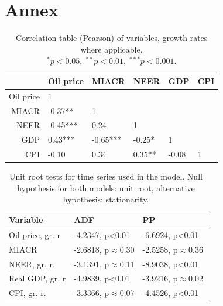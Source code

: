 \documentclass[12pt, a4paper]{extarticle}
\begin{document}
\printbibliography
{}
\newpage
\setcounter{figure}{0}
\setcounter{table}{0}
\makeatletter
\renewcommand*{\thetable}{\alph{table}}
\renewcommand*{\thefigure}{\alph{figure}}
\let\c@table\c@figure
\makeatother 

\section*{Annex}
\label{app}

\begin{table}[h!]
\centering
	\begin{tabular}{@{}rlllll@{}}
	  \toprule
	 & Oil price & MIACR & NEER & GDP & CPI \\ 
	  \midrule
	 	Oil price & 1 &  &  &  &\\ 
  		MIACR& -0.37**  & 1 &  &  & \\ 
  		NEER & -0.45*** & 0.24  &  1  & & \\ 
  		GDP &  0.43***  &  -0.65*** & -0.25* & 1 & \\ 
  		CPI & -0.10  & 0.34  &  0.35** &  -0.08 & 1 \\ 
	   \bottomrule
	\end{tabular}
	\caption{Correlation table (Pearson) of variables, growth rates where applicable.\\ $^*p<0.05,\; ^{**}p<0.01,\;^{***}p<0.001$.}
	\label{table:correlation_variables}
\end{table}

\begin{table}[h!]
	\centering
		\begin{tabular}{@{}lll@{}}
			 \toprule
			Variable & ADF & PP \\
			\midrule
			Oil price, gr. r     & {-4.2347, p\textless{}0.01} &{-6.6924, p\textless{}0.01}   \\
			MIACR                & {-2.6818, p$\approx$0.30}          & {-2.5258, p$\approx$0.36}          \\
			NEER, gr. r.         & {-3.1391, p$\approx$0.11} & {-8.9038, p\textless{}0.01}   \\
			Real GDP, gr. r  & {-4.9839, p\textless{}0.01} & {-3.9216, p$\approx$0.02} \\
			CPI, gr. r.          & {-3.3366, p$\approx$0.07}         & {-4.4526, p\textless{}0.01}\\
			\bottomrule
		\end{tabular}%
	\caption{Unit root tests for time series used in the model. Null hypothesis for both models: unit root, alternative hypothesis: stationarity.}
	\label{table:unit_roots}
\end{table}
\end{document}
